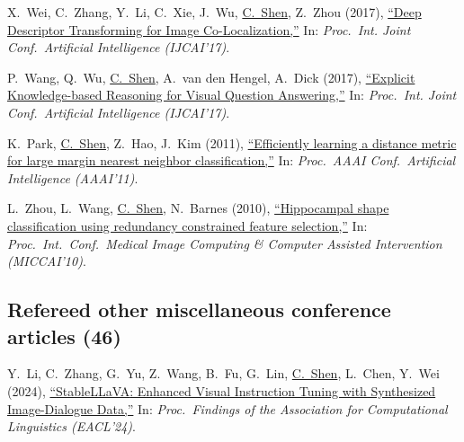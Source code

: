 \documentclass[9pt, a4paper]{article}
\newcommand{\years}[1]{\marginnote{\scriptsize #1}}
\def\highlight{\uline}
\begin{document}
\medskip

\years{2017} X.~Wei, C.~Zhang, Y.~Li, C.~Xie, J.~Wu, \highlight{C.~Shen}, Z.~Zhou (2017),
\href{http://www.google.com/search?lr=&ie=UTF-8&oe=UTF-8&q=Deep+Descriptor+Transforming+for+Image+Co-Localization+Xiu-Shen+Wei%2C+Chen-Lin+Zhang%2C+Yao+Li%2C+Chen-Wei+Xie%2C+Jianxin+Wu%2C+Chunhua+Shen%2C+Zhi-Hua+Zhou}{``Deep Descriptor Transforming for Image Co-Localization,{}''}
In: \emph{Proc.\ Int. Joint Conf.\  Artificial Intelligence (IJCAI'17)}.

\medskip

\years{2017} P.~Wang, Q.~Wu, \highlight{C.~Shen}, A.~van den Hengel, A.~Dick (2017),
\href{http://www.google.com/search?lr=&ie=UTF-8&oe=UTF-8&q=Explicit+Knowledge-based+Reasoning+for+Visual+Question+Answering+Peng+Wang%2C+Qi+Wu%2C+Chunhua+Shen%2C+Anton+van+den+Hengel%2C+Anthony+Dick}{``Explicit Knowledge-based Reasoning for Visual Question Answering,{}''}
In: \emph{Proc.\ Int. Joint Conf.\  Artificial Intelligence (IJCAI'17)}.

\medskip

\years{2011} K.~Park, \highlight{C.~Shen}, Z.~Hao, J.~Kim (2011),
\href{http://www.google.com/search?lr=&ie=UTF-8&oe=UTF-8&q=Efficiently+learning+a+distance+metric+for+large+margin+nearest+neighbor+classification+Kyoungup+Park%2C+Chunhua+Shen%2C+Zhihui+Hao%2C+Junae+Kim}{``Efficiently learning a distance metric for large margin nearest neighbor classification,{}''}
In: \emph{Proc.\ AAAI Conf.\  Artificial Intelligence (AAAI'11)}.

\medskip

\years{2010} L.~Zhou, L.~Wang, \highlight{C.~Shen}, N.~Barnes (2010),
\href{http://www.google.com/search?lr=&ie=UTF-8&oe=UTF-8&q=Hippocampal+shape+classification+using+redundancy+constrained+feature+selection+Luping+Zhou%2C+Lei+Wang%2C+Chunhua+Shen%2C+Nick+Barnes}{``Hippocampal shape classification using redundancy constrained feature selection,{}''}
In: \emph{Proc.\ Int.\ Conf.\  Medical Image Computing \& Computer Assisted Intervention (MICCAI'10)}.

\medskip

\vspace{-0.15cm}
\subsection*{Refereed other miscellaneous conference articles (46)}
\years{2024} \noindent Y.~Li, C.~Zhang, G.~Yu, Z.~Wang, B.~Fu, G.~Lin, \highlight{C.~Shen}, L.~Chen, Y.~Wei (2024),
\href{http://www.google.com/search?lr=&ie=UTF-8&oe=UTF-8&q=StableLLaVA%3A+Enhanced+Visual+Instruction+Tuning+with+Synthesized+Image-Dialogue+Data+Yanda+Li%2C+Chi+Zhang%2C+Gang+Yu%2C+Zhibin+Wang%2C+Bin+Fu%2C+Guosheng+Lin%2C+Chunhua+Shen%2C+Ling+Chen%2C+Yunchao+Wei}{``{StableLLaVA}: Enhanced Visual Instruction Tuning with Synthesized Image-Dialogue Data,{}''}
In: \emph{Proc.\ Findings of the Association for Computational Linguistics (EACL'24)}.
\end{document}
